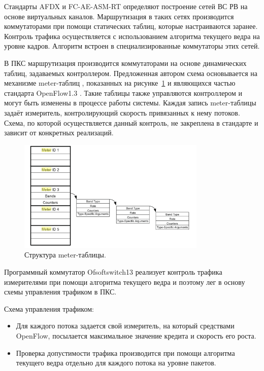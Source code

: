 \documentclass[12pt, a4paper]{article}
\begin{document}
Стандарты AFDX и FC-AE-ASM-RT определяют построение сетей ВС РВ на основе виртуальных каналов. Маршрутизация в таких сетях производится коммутаторами при помощи статических таблиц, которые настраиваются заранее. Контроль трафика осуществляется с использованием алгоритма текущего ведра на уровне кадров. Алгоритм встроен в специализированные коммутаторы этих сетей.

В ПКС маршрутизация производится коммутаторами на основе динамических таблиц, задаваемых контроллером. Предложенная автором схема основывается на механизме meter-таблиц \cite{meter}, показанных на рисунке~\ref{pic:scheme:meter} и являющихся частью стандарта OpenFlow1.3 \cite{openflow}. Такие таблицы также управляются контроллером и могут быть изменены в процессе работы системы. Каждая запись meter-таблицы задаёт измеритель, контролирующий скорость привязанных к нему потоков. Схема, по которой осуществляется данный контроль, не закреплена в стандарте и зависит от конкретных реализаций. 

\begin{figure}[h!]
	\centering
	\includegraphics[width=0.80\textwidth]{img/meter.png}
	\caption{Структура meter-таблицы.}
	\label{pic:scheme:meter}
\end{figure}

Программный коммутатор Ofsoftswitch13 \cite{ofsoftswitch} реализует контроль трафика измерителями при помощи алгоритма текущего ведра и поэтому лег в основу схемы управления трафиком в ПКС.

Схема управления трафиком:
\begin{itemize}
	\item Для каждого потока задается свой измеритель, на который средствами OpenFlow, посылается максимальное значение кредита и скорость его роста.
	\item Проверка допустимости трафика производится при помощи алгоритма текущего ведра отдельно для каждого потока на уровне пакетов.
\end{itemize}
\end{document}
